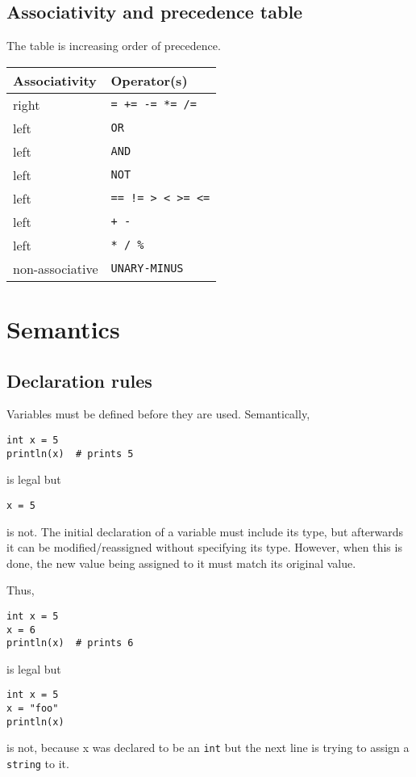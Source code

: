 \documentclass{article}
\begin{document}
\subsection{Associativity and precedence table}
The table is increasing order of precedence.

\begin{table}[h]
\centering
\begin{tabular}{|l|l|}
\hline
Associativity   & Operator(s) \\ \hline
right           & \texttt{= += -= *= /=} \\ \hline
left            & \texttt{OR} \\ \hline
left            & \texttt{AND} \\ \hline
left            & \texttt{NOT} \\ \hline
left            & \texttt{== != > < >= <=} \\ \hline
left            & \texttt{+ -} \\ \hline
left            & \texttt{* / \%} \\ \hline
non-associative & \texttt{UNARY-MINUS} \\
\hline
\end{tabular}
\end{table}

\section{Semantics}
\subsection{Declaration rules}
Variables must be defined before they are used. Semantically,
\begin{verbatim}
int x = 5
println(x)  # prints 5
\end{verbatim}
is legal but 
\begin{verbatim}
x = 5
\end{verbatim}
is not. The initial declaration of a variable must include its type, but afterwards it can be modified/reassigned without specifying its type. However, when this is done, the new value being assigned to it must match its original value.

Thus,
\begin{verbatim}
int x = 5
x = 6
println(x)  # prints 6
\end{verbatim}
is legal but
\begin{verbatim}
int x = 5
x = "foo"
println(x)
\end{verbatim}
is not, because x was declared to be an \texttt{int} but the next line is trying to assign a \texttt{string} to it.
\end{document}
